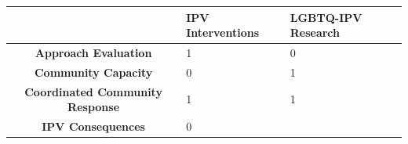 \documentclass[]{tufte-handout}
\begin{document}
\begin{longtable}[]{@{}cll@{}}
\toprule
\begin{minipage}[b]{0.47\columnwidth}\centering\strut
~\strut
\end{minipage} & \begin{minipage}[b]{0.22\columnwidth}\raggedright\strut
IPV Interventions\strut
\end{minipage} & \begin{minipage}[b]{0.22\columnwidth}\raggedright\strut
LGBTQ-IPV Research\strut
\end{minipage}\tabularnewline
\midrule
\endhead
\begin{minipage}[t]{0.47\columnwidth}\centering\strut
\textbf{Approach Evaluation}\strut
\end{minipage} & \begin{minipage}[t]{0.22\columnwidth}\raggedright\strut
1\strut
\end{minipage} & \begin{minipage}[t]{0.22\columnwidth}\raggedright\strut
0\strut
\end{minipage}\tabularnewline
\begin{minipage}[t]{0.47\columnwidth}\centering\strut
\textbf{Community Capacity}\strut
\end{minipage} & \begin{minipage}[t]{0.22\columnwidth}\raggedright\strut
0\strut
\end{minipage} & \begin{minipage}[t]{0.22\columnwidth}\raggedright\strut
1\strut
\end{minipage}\tabularnewline
\begin{minipage}[t]{0.47\columnwidth}\centering\strut
\textbf{Coordinated Community Response}\strut
\end{minipage} & \begin{minipage}[t]{0.22\columnwidth}\raggedright\strut
1\strut
\end{minipage} & \begin{minipage}[t]{0.22\columnwidth}\raggedright\strut
1\strut
\end{minipage}\tabularnewline
\begin{minipage}[t]{0.47\columnwidth}\centering\strut
\textbf{IPV Consequences}\strut
\end{minipage} & \begin{minipage}[t]{0.22\columnwidth}\raggedright\strut
0\strut
\end{minipage} & \begin{minipage}[t]{0.22\columnwidth}\raggedright\strut

\end{minipage}
\end{longtable}
\end{document}
